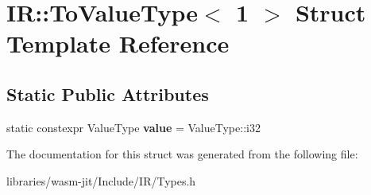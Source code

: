 \hypertarget{struct_i_r_1_1_to_value_type_3_011_01_4}{}\section{IR\+:\+:To\+Value\+Type$<$ 1 $>$ Struct Template Reference}
\label{struct_i_r_1_1_to_value_type_3_011_01_4}
\subsection*{Static Public Attributes}
\begin{DoxyCompactItemize}
\item 
\mbox{\label{struct_i_r_1_1_to_value_type_3_011_01_4_a80b0011482d12bcba60aa2d85a6bcb14}} 
static constexpr Value\+Type {\bfseries value} = Value\+Type\+::i32
\end{DoxyCompactItemize}


The documentation for this struct was generated from the following file\+:\begin{DoxyCompactItemize}
\item 
libraries/wasm-\/jit/\+Include/\+I\+R/Types.\+h\end{DoxyCompactItemize}
